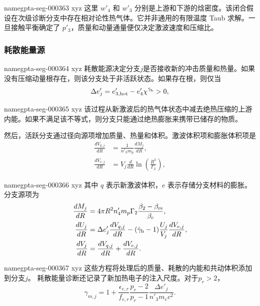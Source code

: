 \documentclass[twocolumn]{aastex702}
\makeatletter
\providecommand{\gptareaderanchor}[1]{\pdfdest name{#1} xyz}%
\providecommand{\gptareaderanchor}[1]{\special{pdf:dest (#1) [ @thispage /XYZ @xpos @ypos null ]}}%
\makeatother
\begin{document}
\gptareaderanchor{gpta-seg-000363}%
这里 \(w'_4\) 和 \(w'_3\) 分别是上游和下游的焓密度。该闭合假设在次级诊断分支中存在相对论性热气体。它并非通用的有限温度 Taub 求解。一旦接触平衡确定了 \(p'_3\)，质量和动量通量便仅决定激波速度和压缩比。

\subsubsection{耗散能量源}


\gptareaderanchor{gpta-seg-000364}%
耗散能源决定分支\(j\)是否接收新的冲击质量和热量。如果没有压缩动量根存在，则该分支处于非活跃状态。如果存在根，则仅当
\begin{equation}
\Delta e'_j=e'_{3,{\rm hot}}-e'_4\chi^{\hat\gamma_{\rm h}}>0,
\end{equation}

\gptareaderanchor{gpta-seg-000365}%
该过程从新激波后的热气体状态中减去绝热压缩的上游内能。如果不满足该不等式，则分支只能通过绝热膨胀来携带已储存的物质。

然后，活跃分支通过径向源项增加质量、热量和体积。激波体积项和膨胀体积项是
\begin{equation}
\begin{aligned}
\frac{dV_{q,j}}{dR}&=\frac{1}{n'_3m_p}\frac{dM_j}{dR},\\
\frac{dV_{e,j}}{dR}
&=V_j\frac{d}{dR}\ln\left(\frac{R^3}{\Gamma_2}\right),
\end{aligned}
\end{equation}

\gptareaderanchor{gpta-seg-000366}%
其中 \(q\) 表示新激波体积，\(e\) 表示存储分支材料的膨胀。分支源项为
\begin{equation}
\begin{aligned}
\frac{dM_j}{dR}
&=4\pi R^2n'_4m_p\Gamma_2
\frac{\beta_2-\beta_{\rm rs}}{\beta_c},\\
\frac{dU_j}{dR}
&=\Delta e'_j\frac{dV_{q,j}}{dR}
-(\hat\gamma_{\rm h}-1)\frac{U_j}{V_j}
\frac{dV_{e,j}}{dR},\\
\frac{dV_j}{dR}
&=\frac{dV_{q,j}}{dR}+\frac{dV_{e,j}}{dR}.
\end{aligned}
\end{equation}

\gptareaderanchor{gpta-seg-000367}%
这些方程将处理后的质量、耗散的内能和共动体积添加到分支\(j\)。
耗散能量诊断还记录了新加热电子的注入尺度。对于\(p_r>2\)，
\begin{equation}
\gamma_{m,j}=1+
\frac{\epsilon_{e,r}}{f_{e,r}}
\frac{p_r-2}{p_r-1}
\frac{\Delta e'_j}{n'_3m_ec^2}.
\end{equation}
\end{document}
